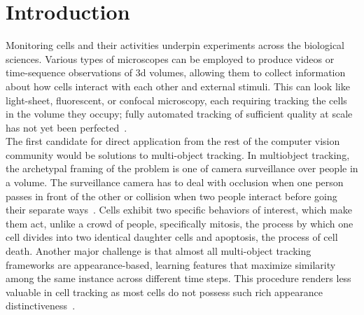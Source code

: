\section{Introduction}
\label{sec:intro}


Monitoring cells and their activities underpin experiments across the biological sciences.  Various types of microscopes can be employed to produce videos or time-sequence observations of 3d volumes, allowing them to collect information about how cells interact with each other and external stimuli.  This can look like light-sheet, fluorescent, or confocal microscopy, each requiring tracking the cells in the volume they occupy; fully automated tracking of sufficient quality at scale has not yet been perfected~\cite{mavska2023cell}.\\

The first candidate for direct application from the rest of the computer vision community would be solutions to multi-object tracking.  In multiobject tracking, the archetypal framing of the problem is one of camera surveillance over people in a volume.  The surveillance camera has to deal with occlusion when one person passes in front of the other or collision when two people interact before going their separate ways~\cite{luo2021multiple}.  Cells exhibit two specific behaviors of interest, which make them act, unlike a crowd of people, specifically mitosis, the process by which one cell divides into two identical daughter cells and apoptosis, the process of cell death. Another major challenge is that almost all multi-object tracking frameworks are appearance-based, learning features that maximize similarity among the same instance across different time steps. This procedure renders less valuable in cell tracking as most cells do not possess such rich appearance distinctiveness~\cite{mavska2023cell}. \\

